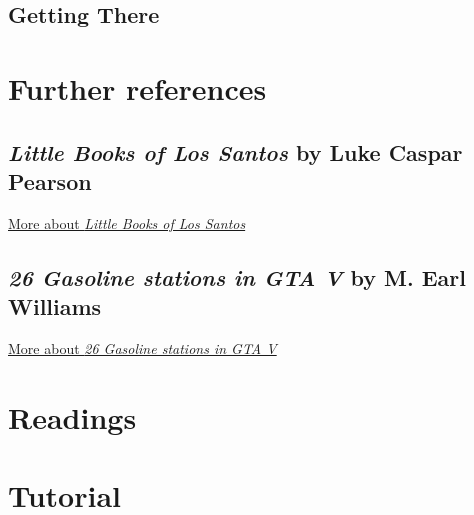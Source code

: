 \documentclass[
  openany]{book}
\begin{document}
\hypertarget{getting-there-4}{%
\subsection*{Getting There}\label{getting-there-4}}

\hypertarget{further-references}{%
\section*{Further references}\label{further-references}}

\hypertarget{little-books-of-los-santos-by-luke-caspar-pearson}{%
\subsection*{\texorpdfstring{\emph{Little Books of Los Santos} by Luke Caspar Pearson}{Little Books of Los Santos by Luke Caspar Pearson}}\label{little-books-of-los-santos-by-luke-caspar-pearson}}

\href{https://www.alephograph.com/little-books-of-los-santos}{More about \emph{Little Books of Los Santos}}

\hypertarget{gasoline-stations-in-gta-v-by-m.-earl-williams}{%
\subsection*{\texorpdfstring{\emph{26 Gasoline stations in GTA V} by M. Earl Williams}{26 Gasoline stations in GTA V by M. Earl Williams}}\label{gasoline-stations-in-gta-v-by-m.-earl-williams}}

\href{https://www.mearlwilliams.com/gasoline_stations\#1}{More about \emph{26 Gasoline stations in GTA V}}

\hypertarget{readings-2}{%
\section*{Readings}\label{readings-2}}

\hypertarget{tutorial-2}{%
\section*{Tutorial}\label{tutorial-2}}
\end{document}
